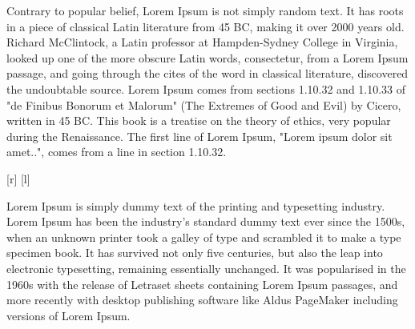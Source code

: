 \documentclass{article}
\begin{document}
Contrary to popular belief, Lorem Ipsum is not simply random text. It
has roots in a piece of classical Latin literature from 45 BC, making
it over 2000 years old. Richard McClintock, a Latin professor at
Hampden-Sydney College in Virginia, looked up one of the more obscure
Latin words, consectetur, from a Lorem Ipsum passage, and going
through the cites of the word in classical literature, discovered the
undoubtable source. Lorem Ipsum comes from sections 1.10.32 and
1.10.33 of "de Finibus Bonorum et Malorum" (The Extremes of Good and
Evil) by Cicero, written in 45 BC. This book is a treatise on the
theory of ethics, very popular during the Renaissance. The first line
of Lorem Ipsum, "Lorem ipsum dolor sit amet..", comes from a line in
section 1.10.32.
\begin{tfeynin}
  [r]
  [l]
\end{tfeynin}
Lorem Ipsum is simply dummy text of the printing and typesetting industry. Lorem Ipsum has been the industry's standard dummy text ever since the 1500s, when an unknown printer took a galley of type and scrambled it to make a type specimen book. It has survived not only five centuries, but also the leap into electronic typesetting, remaining essentially unchanged. It was popularised in the 1960s with the release of Letraset sheets containing Lorem Ipsum passages, and more recently with desktop publishing software like Aldus PageMaker including versions of Lorem Ipsum.
\end{document}
